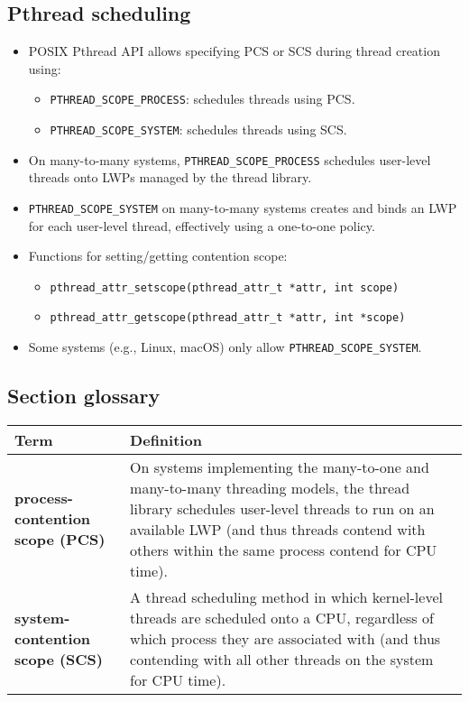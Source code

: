 \subsection{Pthread scheduling}
\begin{itemize}
    \item POSIX Pthread API allows specifying PCS or SCS during thread creation using:
        \begin{itemize}
            \item \texttt{PTHREAD\_SCOPE\_PROCESS}: schedules threads using PCS.
            \item \texttt{PTHREAD\_SCOPE\_SYSTEM}: schedules threads using SCS.
        \end{itemize}
    \item On many-to-many systems, \texttt{PTHREAD\_SCOPE\_PROCESS} schedules user-level threads onto LWPs managed by the thread library.
    \item \texttt{PTHREAD\_SCOPE\_SYSTEM} on many-to-many systems creates and binds an LWP for each user-level thread, effectively using a one-to-one policy.
    \item Functions for setting/getting contention scope:
        \begin{itemize}
            \item \texttt{pthread\_attr\_setscope(pthread\_attr\_t *attr, int scope)}
            \item \texttt{pthread\_attr\_getscope(pthread\_attr\_t *attr, int *scope)}
        \end{itemize}
    \item Some systems (e.g., Linux, macOS) only allow \texttt{PTHREAD\_SCOPE\_SYSTEM}.
\end{itemize}

\subsection*{Section glossary}
\centering
\begin{tabular}{>{\raggedright}p{} >{\raggedright\arraybackslash}p{}}
\toprule
\textbf{Term} & \textbf{Definition} \\
\midrule
\textbf{process-contention scope (PCS)} & On systems implementing the many-to-one and many-to-many threading models, the thread library schedules user-level threads to run on an available LWP (and thus threads contend with others within the same process contend for CPU time). \\
\textbf{system-contention scope (SCS)} & A thread scheduling method in which kernel-level threads are scheduled onto a CPU, regardless of which process they are associated with (and thus contending with all other threads on the system for CPU time). \\
\bottomrule
\end{tabular}
\vspace{\baselineskip}
